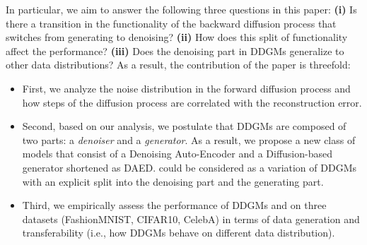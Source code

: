 In particular, we aim to answer the following three questions in this paper: 
\textbf{(i)} Is there a transition in the functionality of the backward diffusion process that switches from generating to denoising?
\textbf{(ii)} How does this split of functionality affect the performance? 
\textbf{(iii)} Does the denoising part in DDGMs generalize to other data distributions? 
As a result, the contribution of the paper is threefold:
\begin{itemize}
    \item First, we analyze the noise distribution in the forward diffusion process and how steps of the diffusion process are correlated with the reconstruction error.
    \item Second, based on our analysis, we postulate that DDGMs are composed of two parts: a \textit{denoiser} and a \textit{generator}. As a result, we propose a new class of models that consist of a Denoising Auto-Encoder and a Diffusion-based generator shortened as DAED. \ours{} could be considered as a variation of DDGMs with an explicit split into the denoising part and the generating part. 
    \item Third, we empirically assess the performance of DDGMs and \ours{} on three datasets (FashionMNIST, CIFAR10, CelebA) in terms of data generation and transferability (i.e., how DDGMs behave on different data distribution).
\end{itemize}
